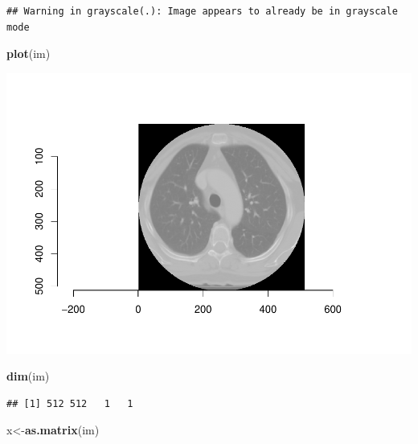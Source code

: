 \documentclass[12pt]{article}
\newenvironment{Shaded}{\begin{snugshade}}{\end{snugshade}}
\newcommand{\KeywordTok}[1]{\textcolor[rgb]{0.13,0.29,0.53}{\textbf{#1}}}
\newcommand{\NormalTok}[1]{#1}
\begin{document}
\begin{verbatim}
## Warning in grayscale(.): Image appears to already be in grayscale mode
\end{verbatim}

\begin{Shaded}
\begin{Highlighting}[]
\KeywordTok{plot}\NormalTok{(im)}
\end{Highlighting}
\end{Shaded}

\includegraphics{report_files/figure-latex/unnamed-chunk-10-1.pdf}

\begin{Shaded}
\begin{Highlighting}[]
\KeywordTok{dim}\NormalTok{(im)}
\end{Highlighting}
\end{Shaded}

\begin{verbatim}
## [1] 512 512   1   1
\end{verbatim}

\begin{Shaded}
\begin{Highlighting}[]
\NormalTok{x<-}\KeywordTok{as.matrix}\NormalTok{(im)}
\end{Highlighting}
\end{Shaded}
\end{document}
